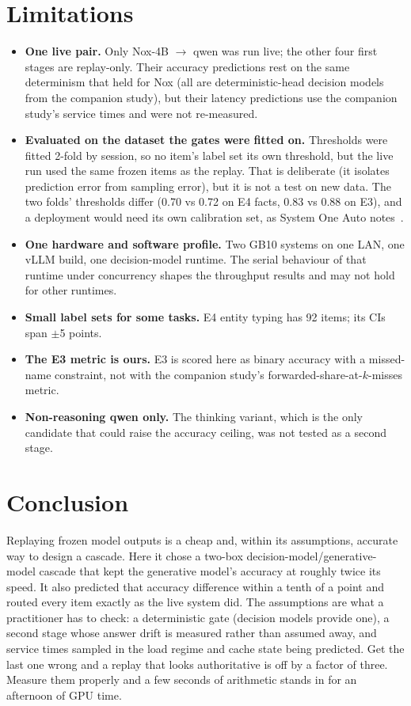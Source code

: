 \documentclass[11pt]{article}
\begin{document}
\section{Limitations}
\begin{itemize}
  \item \textbf{One live pair.} Only Nox-4B $\rightarrow$ qwen was run live; the other four first
        stages are replay-only. Their accuracy predictions rest on the same determinism that held for
        Nox (all are deterministic-head decision models from the companion study), but their latency
        predictions use the companion study's service times and were not re-measured.
  \item \textbf{Evaluated on the dataset the gates were fitted on.} Thresholds were fitted 2-fold by
        session, so no item's label set its own threshold, but the live run used the same frozen items
        as the replay. That is deliberate (it isolates prediction error from sampling error), but it
        is not a test on new data. The two folds' thresholds differ (0.70 vs 0.72 on E4 facts, 0.83
        vs 0.88 on E3), and a deployment would need its own calibration set, as System One Auto
        notes~\cite{sysoneauto}.
  \item \textbf{One hardware and software profile.} Two GB10 systems on one LAN, one vLLM build, one
        decision-model runtime. The serial behaviour of that runtime under concurrency shapes the
        throughput results and may not hold for other runtimes.
  \item \textbf{Small label sets for some tasks.} E4 entity typing has 92 items; its CIs span
        $\pm$5 points.
  \item \textbf{The E3 metric is ours.} E3 is scored here as binary accuracy with a missed-name
        constraint, not with the companion study's forwarded-share-at-$k$-misses metric.
  \item \textbf{Non-reasoning qwen only.} The thinking variant, which is the only candidate that
        could raise the accuracy ceiling, was not tested as a second stage.
\end{itemize}

\section{Conclusion}
Replaying frozen model outputs is a cheap and, within its assumptions, accurate way to design a
cascade. Here it chose a two-box decision-model/generative-model cascade that kept the generative
model's accuracy at roughly twice its speed. It also predicted that accuracy difference within a tenth
of a point and routed every item exactly as the live system did. The assumptions are what a
practitioner has to check: a deterministic gate (decision models provide one), a second stage whose
answer drift is measured rather than assumed away, and service times sampled in the load regime and
cache state being predicted. Get the last one wrong and a replay that looks authoritative is off by a
factor of three. Measure them properly and a few seconds of arithmetic stands in for an afternoon of
GPU time.
\end{document}
